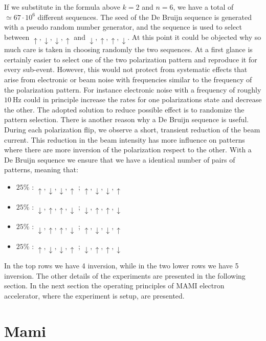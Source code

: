If we substitute in the formula above $k=2$ and $n = 6$, we have a total of $\simeq 67 \cdot 10^{6}$ different sequences. The seed of the De Bruijn sequence is generated with a pseudo random number generator, and the sequence is used to select between $\uparrow,\downarrow,\downarrow, \uparrow$  and $\downarrow,\uparrow,\uparrow,\downarrow$. At this point it could be objected why so much care is taken in choosing randomly the two sequences. At a first glance is certainly easier to select one of the two polarization pattern and reproduce it for every sub-event. However, this would not protect from systematic effects that arise from electronic or beam noise with frequencies similar to the frequency of the polarization pattern. For instance electronic noise with a frequency of roughly $\SI{10}{\hertz}$ could in principle increase the rates for one polarizations state and decrease the other. The adopted solution to reduce possible effect is to randomize the pattern selection. There is another reason why a De Bruijn sequence is useful. During each polarization flip, we observe a short, transient reduction of the beam current. This reduction in the beam intensity has more influence on patterns where there are more inversion of the polarization respect to the other. With a De Bruijn sequence we ensure that we have a identical number of pairs of patterns, meaning that:

\begin{itemize}
\item $25\%$ : $\uparrow,\downarrow,\downarrow, \uparrow$ ; $\uparrow,\downarrow,\downarrow, \uparrow$
\item $25\%$ : $\downarrow,\uparrow, \uparrow,\downarrow$ ; $\downarrow,\uparrow, \uparrow,\downarrow$
\item $25\%$ : $\downarrow,\uparrow, \uparrow,\downarrow$ ; $\uparrow,\downarrow,\downarrow, \uparrow$
\item $25\%$ : $\uparrow,\downarrow,\downarrow, \uparrow$ ; $\downarrow,\uparrow, \uparrow,\downarrow$
\end{itemize}

In the top rows we have 4 inversion, while in the two lower rows we have 5 inversion.
The other details of the experiments are presented in the following section. In the next section the operating principles of MAMI electron accelerator, where the experiment is setup, are presented.

\section{Mami}

